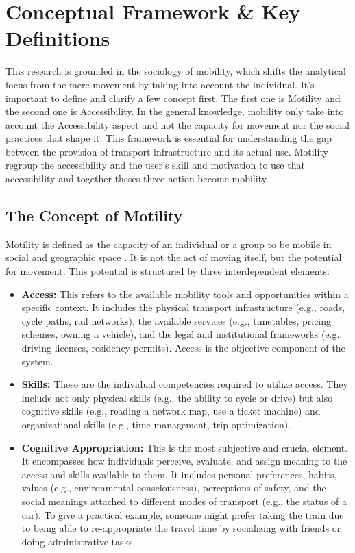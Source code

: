 \section{Conceptual Framework \& Key Definitions}
This research is grounded in the sociology of mobility, which shifts the analytical focus from the mere movement by taking into account the individual.
It's important to define and clarify a few concept first. The first one is Motility and the second one is Accessibility. In the general knowledge, mobility only take into account the Accessibility aspect and not the capacity for movement nor the social practices that shape it. This framework is essential for understanding the gap between the provision of transport infrastructure and its actual use. Motility regroup the accessibility and the user's skill and motivation to use that accessibility and together theses three notion become mobility.

\subsection{The Concept of Motility}

Motility is defined as the capacity of an individual or a group to be mobile in social and geographic space \cite{kaufmann_motility_2004}. It is not the act of moving itself, but the potential for movement. This potential is structured by three interdependent elements:

\begin{itemize}
    \item \textbf{Access:} This refers to the available mobility tools and opportunities within a specific context. It includes the physical transport infrastructure (e.g., roads, cycle paths, rail networks), the available services (e.g., timetables, pricing schemes, owning a vehicle), and the legal and institutional frameworks (e.g., driving licenses, residency permits). Access is the objective component of the system.

    \item \textbf{Skills:} These are the individual competencies required to utilize access. They include not only physical skills (e.g., the ability to cycle or drive) but also cognitive skills (e.g., reading a network map, use a ticket machine) and organizational skills (e.g., time management, trip optimization).

    \item \textbf{Cognitive Appropriation:} This is the most subjective and crucial element. It encompasses how individuals perceive, evaluate, and assign meaning to the access and skills available to them. It includes personal preferences, habits, values (e.g., environmental consciousness), perceptions of safety, and the social meanings attached to different modes of transport (e.g., the status of a car). To give a practical example, someone might prefer taking the train due to being able to re-appropriate the travel time by socializing with friends or doing administrative tasks.
\end{itemize}

